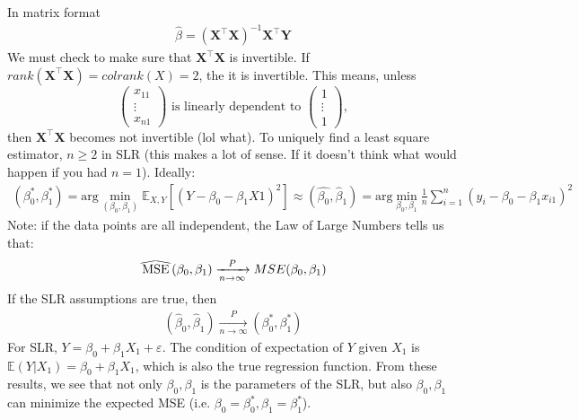 \documentclass{article}
\newcommand{\E}{\mathbb{E}}
\newcommand{\boldX}{\mathbf{X}}
\newcommand{\boldY}{\mathbf{Y}}
\newcommand{\argmin}{\text{arg}\min}
\newcommand{\sumiton}{\sum_{i=1}^n}
\newcommand\reallywidehat[1]{%
\savestack{\tmpbox}{\stretchto{%
  \scaleto{%
    \scalerel*[\widthof{\ensuremath{#1}}]{\kern-.6pt\bigwedge\kern-.6pt}%
    {\rule[-\textheight/2]{1ex}{\textheight}}%
  }{\textheight}%
}{0.5ex}}%
\stackon[1pt]{#1}{\tmpbox}%
}
\begin{document}
\noindent In matrix format
\begin{align}
    \hat{\beta} = (\boldX^\top\boldX)^{-1}\boldX^\top\boldY
\end{align}
We must check to make sure that $\boldX^\top\boldX$ is invertible.
If $rank(\boldX^\top\boldX) = colrank(X) = 2$, the it is invertible. This means, unless
\[\begin{pmatrix}
    x_{11}\\
    \vdots\\
    x_{n1}
\end{pmatrix} \text{ is linearly dependent to }\begin{pmatrix}
    1\\
    \vdots\\
    1
\end{pmatrix},
\]
then $\boldX^\top\boldX$ becomes not invertible (lol what).
\bigbreak\noindent
To uniquely find a least square estimator, $n\geq2$ in SLR (this makes a lot of sense. If it doesn't think what would happen if you had $n=1$). Ideally:
\begin{align}
    (\beta_0^*,\beta_1^*) = \argmin_{(\beta_0,\beta_1)}\E_{X,Y}[(Y-\beta_0-\beta_1X1)^2] \approx (\hat{\beta_0},\hat{\beta}_1) = \argmin_{\beta_0,\beta_1} \frac{1}{n}\sumiton(y_i - \beta_0 - \beta_1x_{i1})^2
\end{align}
Note: if the data points are all independent, the Law of Large Numbers tells us that:
\begin{align}
    \reallywidehat{MSE}(\beta_0,\beta_1) \xrightarrow[n \rightarrow \infty]{P} MSE(\beta_0,\beta_1)
\end{align}
If the SLR assumptions are true, then
\begin{align}
    (\hat{\beta}_0,\hat{\beta}_1) \xrightarrow[n \rightarrow \infty]{P} (\beta_0^*,\beta_1^*)
\end{align}
For SLR, $Y = \beta_0 + \beta_1X_1 + \varepsilon$. The condition of expectation of $Y$ given $X_1$ is $\E(Y | X_1) = \beta_0 + \beta_1X_1$, which is also the true regression function. From these results, we see that not only $\beta_0,\beta_1$ is the parameters of the SLR, but also $\beta_0,\beta_1$ can minimize the expected MSE (i.e. $\beta_0 = \beta_0^*, \beta_1 = \beta_1^*$).
\end{document}
